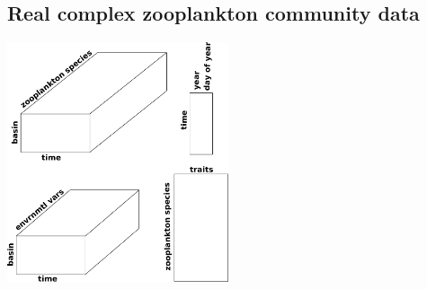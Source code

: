 \documentclass{beamer}
\numberwithin{exercise}{section}
\begin{document}
%

\subsection[Real data]{Real complex zooplankton community data}

\begin{frame}
\begin{center}
\includegraphics[width=6.5cm]{BeatrixTableCartoon}
\end{center}
\end{frame}
\end{document}

